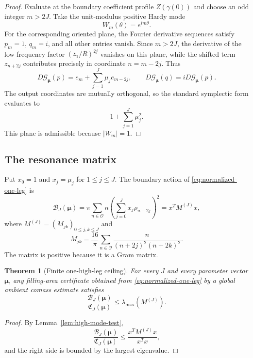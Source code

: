 \documentclass[11pt]{article}
\newtheorem{theorem}{Theorem}[section]
\begin{document}
\begin{proof}
Evaluate at the boundary coefficient profile $Z(\gamma(0))$ and choose an odd
integer $m>2J$.  Take the unit-modulus positive Hardy mode
\[
        W_m(\theta)=e^{im\theta}.
\]
For the corresponding oriented plane, the Fourier derivative sequences satisfy
$p_m=1$, $q_m=i$, and all other entries vanish.  Since $m>2J$, the derivative
of the low-frequency factor $(\overline z_1/R)^{2j}$ vanishes on this plane,
while the shifted term $z_{n+2j}$ contributes precisely in coordinate
$n=m-2j$.  Thus
\[
 D\mathcal G_{\boldsymbol\mu}(p)
 =e_m+\sum_{j=1}^J\mu_je_{m-2j},
 \qquad
 D\mathcal G_{\boldsymbol\mu}(q)
 =iD\mathcal G_{\boldsymbol\mu}(p).
\]
The output coordinates are mutually orthogonal, so the standard symplectic form
evaluates to
\[
        1+\sum_{j=1}^J\mu_j^2.
\]
This plane is admissible because $|W_m|=1$.
\end{proof}

\subsection{The resonance matrix}

Put $x_0=1$ and $x_j=\mu_j$ for $1\le j\le J$.  The boundary action of
\eqref{eq:normalized-one-leg} is
\begin{equation}\label{eq:one-leg-boundary-action}
 \mathcal B_J(\boldsymbol\mu)
 =\pi\sum_{n\in\mathcal O}n
 \left(\sum_{j=0}^Jx_j\rho_{n+2j}\right)^2
 =x^TM^{(J)}x,
\end{equation}
where $M^{(J)}=(M_{jk})_{0\le j,k\le J}$ and
\begin{equation}\label{eq:resonance-matrix}
 \boxed{
 M_{jk}
 =\frac{16}{\pi}
 \sum_{n\in\mathcal O}
 \frac{n}{(n+2j)^2(n+2k)^2}.}
\end{equation}
The matrix is positive because it is a Gram matrix.

\begin{theorem}[Finite one-high-leg ceiling]\label{thm:finite-one-leg-ceiling}
For every $J$ and every parameter vector $\boldsymbol\mu$, any filling-area
certificate obtained from \eqref{eq:normalized-one-leg} by a global ambient
comass estimate satisfies
\begin{equation}\label{eq:finite-rayleigh-ceiling}
 \boxed{
 \frac{\mathcal B_J(\boldsymbol\mu)}
      {\mathfrak C_J(\boldsymbol\mu)}
 \le\lambda_{\max}(M^{(J)}).}
\end{equation}
\end{theorem}

\begin{proof}
By Lemma~\ref{lem:high-mode-test},
\[
 \frac{\mathcal B_J(\boldsymbol\mu)}
      {\mathfrak C_J(\boldsymbol\mu)}
 \le
 \frac{x^TM^{(J)}x}{x^Tx},
\]
and the right side is bounded by the largest eigenvalue.
\end{proof}
\end{document}
